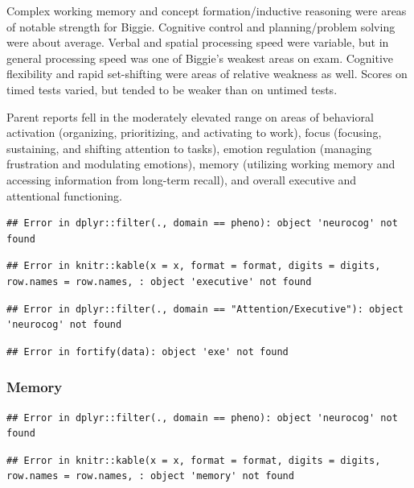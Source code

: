 \documentclass[%
numbers=noendperiod,
parskip=half,
bibliography=totoc,
DIV=calc,headsepline=true,
]{scrartcl}
\begin{document}
Complex working memory and concept formation/inductive reasoning were areas of
notable strength for Biggie. Cognitive control and planning/problem
solving were about average. Verbal and spatial processing speed were variable,
but in general processing speed was one of Biggie's weakest areas on
exam. Cognitive flexibility and rapid set-shifting were areas of relative
weakness as well. Scores on timed tests varied, but tended to be weaker than on
untimed tests.

Parent reports fell in the moderately elevated range on areas of behavioral
activation (organizing, prioritizing, and activating to work), focus (focusing,
sustaining, and shifting attention to tasks), emotion regulation (managing
frustration and modulating emotions), memory (utilizing working memory and
accessing information from long-term recall), and overall executive and
attentional functioning.

\begin{verbatim}
## Error in dplyr::filter(., domain == pheno): object 'neurocog' not found
\end{verbatim}

\begin{verbatim}
## Error in knitr::kable(x = x, format = format, digits = digits, row.names = row.names, : object 'executive' not found
\end{verbatim}

\begin{verbatim}
## Error in dplyr::filter(., domain == "Attention/Executive"): object 'neurocog' not found
\end{verbatim}

\begin{verbatim}
## Error in fortify(data): object 'exe' not found
\end{verbatim}

\newpage

\hypertarget{memory}{%
\subsubsection{Memory}\label{memory}}

\begin{verbatim}
## Error in dplyr::filter(., domain == pheno): object 'neurocog' not found
\end{verbatim}




\begin{verbatim}
## Error in knitr::kable(x = x, format = format, digits = digits, row.names = row.names, : object 'memory' not found
\end{verbatim}
\end{document}
